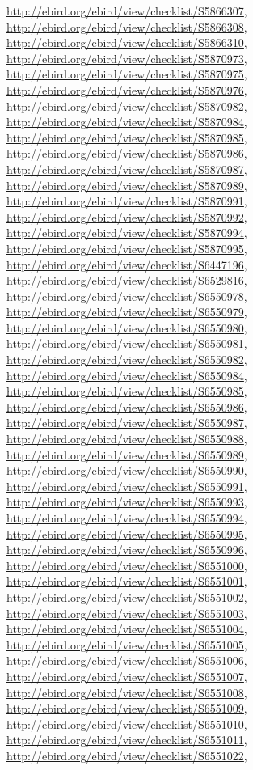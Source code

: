\documentclass[9pt, article]{memoir}
\begin{document}
\begin{multicols}{2}
\url{http://ebird.org/ebird/view/checklist/S5866307}, 
\url{http://ebird.org/ebird/view/checklist/S5866308}, 
\url{http://ebird.org/ebird/view/checklist/S5866310}, 
\url{http://ebird.org/ebird/view/checklist/S5870973}, 
\url{http://ebird.org/ebird/view/checklist/S5870975}, 
\url{http://ebird.org/ebird/view/checklist/S5870976}, 
\url{http://ebird.org/ebird/view/checklist/S5870982}, 
\url{http://ebird.org/ebird/view/checklist/S5870984}, 
\url{http://ebird.org/ebird/view/checklist/S5870985}, 
\url{http://ebird.org/ebird/view/checklist/S5870986}, 
\url{http://ebird.org/ebird/view/checklist/S5870987}, 
\url{http://ebird.org/ebird/view/checklist/S5870989}, 
\url{http://ebird.org/ebird/view/checklist/S5870991}, 
\url{http://ebird.org/ebird/view/checklist/S5870992}, 
\url{http://ebird.org/ebird/view/checklist/S5870994}, 
\url{http://ebird.org/ebird/view/checklist/S5870995}, 
\url{http://ebird.org/ebird/view/checklist/S6447196}, 
\url{http://ebird.org/ebird/view/checklist/S6529816}, 
\url{http://ebird.org/ebird/view/checklist/S6550978}, 
\url{http://ebird.org/ebird/view/checklist/S6550979}, 
\url{http://ebird.org/ebird/view/checklist/S6550980}, 
\url{http://ebird.org/ebird/view/checklist/S6550981}, 
\url{http://ebird.org/ebird/view/checklist/S6550982}, 
\url{http://ebird.org/ebird/view/checklist/S6550984}, 
\url{http://ebird.org/ebird/view/checklist/S6550985}, 
\url{http://ebird.org/ebird/view/checklist/S6550986}, 
\url{http://ebird.org/ebird/view/checklist/S6550987}, 
\url{http://ebird.org/ebird/view/checklist/S6550988}, 
\url{http://ebird.org/ebird/view/checklist/S6550989}, 
\url{http://ebird.org/ebird/view/checklist/S6550990}, 
\url{http://ebird.org/ebird/view/checklist/S6550991}, 
\url{http://ebird.org/ebird/view/checklist/S6550993}, 
\url{http://ebird.org/ebird/view/checklist/S6550994}, 
\url{http://ebird.org/ebird/view/checklist/S6550995}, 
\url{http://ebird.org/ebird/view/checklist/S6550996}, 
\url{http://ebird.org/ebird/view/checklist/S6551000}, 
\url{http://ebird.org/ebird/view/checklist/S6551001}, 
\url{http://ebird.org/ebird/view/checklist/S6551002}, 
\url{http://ebird.org/ebird/view/checklist/S6551003}, 
\url{http://ebird.org/ebird/view/checklist/S6551004}, 
\url{http://ebird.org/ebird/view/checklist/S6551005}, 
\url{http://ebird.org/ebird/view/checklist/S6551006}, 
\url{http://ebird.org/ebird/view/checklist/S6551007}, 
\url{http://ebird.org/ebird/view/checklist/S6551008}, 
\url{http://ebird.org/ebird/view/checklist/S6551009}, 
\url{http://ebird.org/ebird/view/checklist/S6551010}, 
\url{http://ebird.org/ebird/view/checklist/S6551011}, 
\url{http://ebird.org/ebird/view/checklist/S6551022}, 

\end{multicols}
\end{document}
